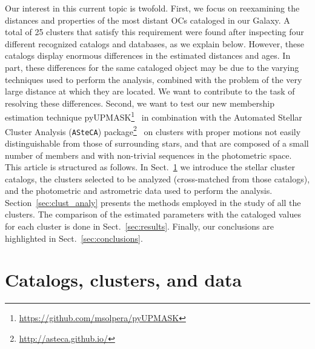\documentclass{aa}
\begin{document}
 Our interest in this current topic is twofold. First, we focus
 on reexamining the distances and properties of the most distant OCs cataloged
 in our Galaxy. A total of 25 clusters that satisfy this requirement were
 found after inspecting four different recognized catalogs and databases, as we 
 explain below.
 However, these catalogs display enormous differences in the estimated distances
 and ages. In part, these differences for the same cataloged object may be due
 to the varying techniques used to perform the analysis, combined with
 the problem of the very large distance at which they are located.
 We want to contribute to the task of resolving these differences.
 Second, we want to test our new membership estimation technique
 pyUPMASK\footnote{\url{https://github.com/msolpera/pyUPMASK}}~\citep{Pera_2021}
 in combination with the Automated Stellar Cluster Analysis (\texttt{ASteCA}) package\footnote{\url{http://asteca.github.io/}}~\citep{Perren_2015}
 on clusters with proper motions  not easily distinguishable from those
 of surrounding stars, and that are composed of a small number of members and with
 non-trivial sequences in the photometric space.\\


 This article is structured as follows. In Sect.~\ref{sec:cat_clust_data} we
 introduce the stellar cluster catalogs, the clusters selected to be
 analyzed (cross-matched from those catalogs), and the photometric and
 astrometric data used to perform the analysis.
 Section~\ref{sec:clust_analy} presents the methods employed in the study of all the
 clusters. The comparison of the estimated parameters with the cataloged
 values for each cluster is done in Sect.~\ref{sec:results}. Finally,
 our conclusions are highlighted in Sect.~\ref{sec:conclusions}.





\section{Catalogs, clusters, and data}
 \label{sec:cat_clust_data}
\end{document}
